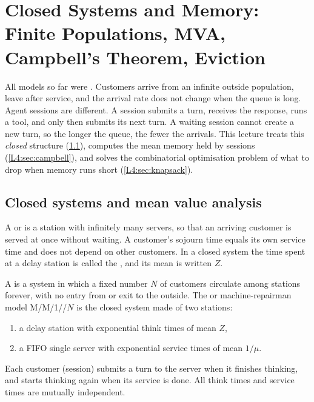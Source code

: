 \chapter{Closed Systems and Memory: Finite Populations, MVA, Campbell's Theorem, Eviction}\label{sec:L4}

All models so far were . Customers arrive from an infinite
outside population, leave after service, and the arrival rate does not change
when the queue is long. Agent sessions are different. A session submits a turn,
receives the response, runs a tool, and only then submits its next turn. A
waiting session cannot create a new turn, so the longer the queue, the fewer the
arrivals. This lecture treats this \emph{closed} structure
(\cref{L4:sec:closed}), computes the mean memory held by sessions
(\cref{L4:sec:campbell}), and solves the combinatorial optimisation problem of
what to drop when memory runs short (\cref{L4:sec:knapsack}).

\section{Closed systems and mean value analysis}\label{L4:sec:closed}

\begin{definition}\label{L4:def:delay}
A  or  is a station with
infinitely many servers, so that an arriving customer is served at once without
waiting. A customer's sojourn time equals its own service time and does not
depend on other customers. In a closed system the time spent at a delay station
is called the , and its mean is written $Z$.
\end{definition}

\begin{definition}\label{L4:def:closed}
A  is a system in which a fixed number $N$ of customers
circulate among stations forever, with no entry from or exit to the outside. The
 or machine-repairman model M/M/1//$N$ is the closed
system made of two stations:
\begin{enumerate}[label=(\alph*)]
\item a delay station with exponential think times of mean $Z$,
\item a FIFO single server with exponential service times of mean $1/\mu$.
\end{enumerate}
Each customer (session) submits a turn to the server when it finishes thinking,
and starts thinking again when its service is done. All think times and service
times are mutually independent.
\end{definition}

